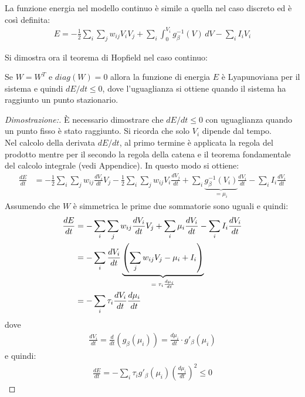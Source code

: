 La funzione energia nel modello continuo è simile a quella nel caso discreto ed è così definita:
\begin{align}
    E = - \frac{1}{2} \sum_i \sum_j w_{ij} V_i V_j + \sum_i \int_0^{V_i} g^{-1}_\beta (V) \, dV - \sum_i I_i V_i
\end{align}

Si dimostra ora il teorema di Hopfield nel caso continuo: 
\begin{thm}
	Se $W=W^T$ e $diag(W) = 0$ allora la funzione di energia $E$ è Lyapunoviana per il sistema e quindi $dE / dt \leq 0$, dove l'uguaglianza si ottiene quando il sistema ha raggiunto un punto stazionario.
\end{thm}

\begin{proof}[Dimostrazione:]
	È necessario dimostrare che $dE / dt \leq 0$ con uguaglianza quando un punto fisso è stato raggiunto. Si ricorda che solo $V_i$ dipende dal tempo.\\
	
	Nel calcolo della derivata $dE / dt$, al primo termine è applicata la regola del prodotto mentre per il secondo la regola della catena e il teorema fondamentale del calcolo integrale (vedi Appendice). In questo modo si ottiene:
	\begin{align*}
        \frac{dE}{dt} &= - \frac{1}{2} \sum_i \sum_j w_{ij} \frac{dV_i}{dt} V_j - \frac{1}{2} \sum_i \sum_j w_{ij} V_i \frac{dV_j}{dt} + \sum_i \underbrace{g_\beta^{-1}(V_i)}_\textrm{$= \mu_i$} \frac{dV_i}{dt} - \sum_i I_i \frac{d V_i}{dt} 
	\end{align*}
	Assumendo che $W$ è simmetrica le prime due sommatorie sono uguali e quindi:
	\begin{align*}
        \frac{dE}{dt} &=  - \sum_i \sum_j w_{ij} \frac{dV_i}{dt} V_j + \sum_i \mu_i \frac{dV_i}{dt} - \sum_i I_i \frac{d V_i}{dt} \\
		&= - \sum_i \frac{d V_i}{dt} \underbrace{\left(\sum_j w_{ij} V_j - \mu_i + I_i \right)}_\textrm{$ = \tau_i \frac{d \mu_i}{dt}$} \\
        &= - \sum_i \tau_i \frac{d V_i}{dt} \frac{d \mu_i}{dt}
	\end{align*}
	dove
	\begin{align*}
		\frac{d V_i}{dt} = \frac{d}{dt} \left(g_\beta (\mu_i) \right) = \frac{d \mu_i}{dt} \cdot g'_\beta(\mu_i)
	\end{align*}
	e quindi:
	\begin{align*}
        \frac{dE}{dt} = - \sum_i \tau_i g'_\beta(\mu_i) \left(\frac{d\mu_i}{dt} \right)^2 \leq 0
    \end{align*}
	

\end{proof}
